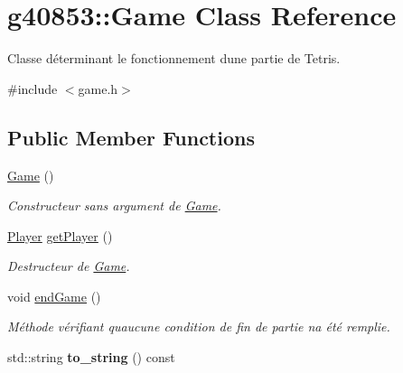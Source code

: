 \hypertarget{classg40853_1_1_game}{}\section{g40853\+:\+:Game Class Reference}
\label{classg40853_1_1_game}


Classe déterminant le fonctionnement d\textquotesingle{}une partie de Tetris.  




{\ttfamily \#include $<$game.\+h$>$}

\subsection*{Public Member Functions}
\begin{DoxyCompactItemize}
\item 
\hyperlink{classg40853_1_1_game_a14aecdfb4017cab53a2aa357356247fd}{Game} ()
\begin{DoxyCompactList}\small\item\em Constructeur sans argument de \hyperlink{classg40853_1_1_game}{Game}. \end{DoxyCompactList}\item 
\hyperlink{classg40853_1_1_player}{Player} \hyperlink{classg40853_1_1_game_a09eefcbee51b67f432bc65badaf6647f}{get\+Player} ()
\begin{DoxyCompactList}\small\item\em Destructeur de \hyperlink{classg40853_1_1_game}{Game}. \end{DoxyCompactList}\item 
void \hyperlink{classg40853_1_1_game_a0225ae5ad14eaae0b4ff711827951444}{end\+Game} ()
\begin{DoxyCompactList}\small\item\em Méthode vérifiant qu\textquotesingle{}aucune condition de fin de partie n\textquotesingle{}a été remplie. \end{DoxyCompactList}\item 
\hypertarget{classg40853_1_1_game_ac2dba7284fac06ed9a0e2b49dcd6b50e}{}\label{classg40853_1_1_game_ac2dba7284fac06ed9a0e2b49dcd6b50e} 
std\+::string {\bfseries to\+\_\+string} () const
\end{DoxyCompactItemize}
